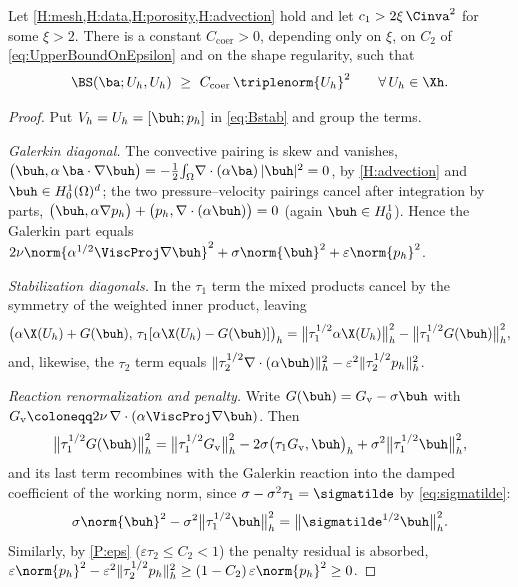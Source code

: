\begin{lemma}[Coercivity]\label{lem:coercivity}
Let \cref{H:mesh,H:data,H:porosity,H:advection} hold and let $c_1 > 2\xi\,\Cinva^2$ for some $\xi>2$. There is
a constant $C_{\mathrm{coer}}>0$, depending only on $\xi$, on $C_2$ of \eqref{eq:UpperBoundOnEpsilon} and
on the shape regularity, such that
\begin{equation}\label{eq:coercivity}
  \BS(\ba; U_h,U_h) \ \ge\ C_{\mathrm{coer}}\,\triplenorm{U_h}^2
  \qquad\forall\,U_h\in\Xh .
\end{equation}
\end{lemma}

\begin{proof}
Put $V_h=U_h=[\buh;p_h]$ in \eqref{eq:Bstab} and group the terms.

\emph{Galerkin diagonal.}
The convective pairing is skew and vanishes,
$\bigl(\buh,\alpha\,\ba\cdot\nabla\buh\bigr)
=-\tfrac12\!\int_\Omega\!\nabla\cdot(\alpha\ba)\,|\buh|^2=0$,
by \cref{H:advection} and $\buh\in H^1_0(\Omega)^d$; the two pressure--velocity pairings
cancel after integration by parts,
$\bigl(\buh,\alpha\nabla p_h\bigr)+\bigl(p_h,\nabla\cdot(\alpha\buh)\bigr)=0$ (again
$\buh\in H^1_0$). Hence the Galerkin part equals
$2\nu\norm{\alpha^{1/2}\ViscProj\nabla\buh}^2+\sigma\norm{\buh}^2+\varepsilon\norm{p_h}^2$.

\emph{Stabilization diagonals.}
In the $\tau_1$ term the mixed products cancel by the symmetry of the weighted inner
product, leaving
\begin{equation}\label{eq:stabdiag1}
  \bigl(\alpha\X(U_h)+G(\buh),\,\tau_1[\alpha\X(U_h)-G(\buh)]\bigr)_h
  = \bigl\lVert\tau_1^{1/2}\alpha\X(U_h)\bigr\rVert_h^2
  - \bigl\lVert\tau_1^{1/2}G(\buh)\bigr\rVert_h^2 ,
\end{equation}
and, likewise, the $\tau_2$ term equals
$\lVert\tau_2^{1/2}\nabla\cdot(\alpha\buh)\rVert_h^2
-\varepsilon^2\lVert\tau_2^{1/2}p_h\rVert_h^2$.

\emph{Reaction renormalization and penalty.}
Write $G(\buh)=G_{\mathrm v}-\sigma\buh$ with
$G_{\mathrm v}\coloneqq 2\nu\,\nabla\cdot(\alpha\ViscProj\nabla\buh)$. Then
\begin{equation}\label{eq:Gexpand}
  \bigl\lVert\tau_1^{1/2}G(\buh)\bigr\rVert_h^2
  = \bigl\lVert\tau_1^{1/2}G_{\mathrm v}\bigr\rVert_h^2
  - 2\sigma\bigl(\tau_1 G_{\mathrm v},\buh\bigr)_h
  + \sigma^2\bigl\lVert\tau_1^{1/2}\buh\bigr\rVert_h^2 ,
\end{equation}
and its last term recombines with the Galerkin reaction into the damped coefficient of the
working norm, since $\sigma-\sigma^2\tau_1=\sigmatilde$ by \eqref{eq:sigmatilde}:
\begin{equation}\label{eq:reactrenorm}
  \sigma\norm{\buh}^2-\sigma^2\bigl\lVert\tau_1^{1/2}\buh\bigr\rVert_h^2
  = \bigl\lVert\sigmatilde^{1/2}\buh\bigr\rVert_h^2 .
\end{equation}
Similarly, by \ref{P:eps} ($\varepsilon\tau_2\le C_2<1$) the penalty residual is absorbed,
$\varepsilon\norm{p_h}^2-\varepsilon^2\lVert\tau_2^{1/2}p_h\rVert_h^2
\ge (1-C_2)\,\varepsilon\norm{p_h}^2\ge 0$.


\end{proof}
